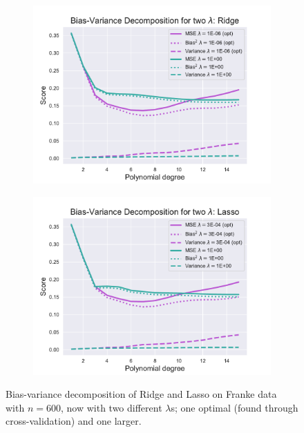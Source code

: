 \documentclass[twocolumn,english,notitlepage]{article}
\begin{document}
            \begin{figure}[ht]
                \begin{subfigure}{\linewidth}
                    \centering
                    \includegraphics[width=.9\linewidth]{BS_bias_var_two_lmbdas_Ridge.pdf}
                \end{subfigure}
                \begin{subfigure}{\linewidth}
                    \centering
                    \includegraphics[width=.9\linewidth]{BS_bias_var_two_lmbdas_Lasso.pdf}
                \end{subfigure}
                \caption{Bias-variance decomposition of Ridge and Lasso on Franke data with $n=600$, now with two different $\lambda$s; one optimal (found through cross-validation) and one larger.}
                \label{res:fig:bs_bias_var_two_lmbdas_Ridge_Lasso}
            \end{figure}
            
\end{document}
